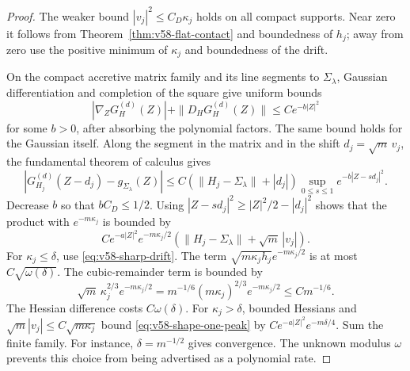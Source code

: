 \begin{proof}
The weaker bound $|v_j|^2\le C_D\kappa_j$ holds on all compact
supports. Near zero it follows from Theorem~\ref{thm:v58-flat-contact}
and boundedness of $h_j$; away from zero use the positive minimum of
$\kappa_j$ and boundedness of the drift.

On the compact accretive matrix family and its line segments to
$\Sigma_\lambda$, Gaussian differentiation and completion of the
square give uniform bounds
\[
 |\nabla_ZG_H^{(d)}(Z)|+\|D_HG_H^{(d)}(Z)\|
                                  \le C e^{-b|Z|^2}
\]
for some $b>0$, after absorbing the polynomial factors. The same
bound holds for the Gaussian itself. Along the segment in the
matrix and in the shift $d_j=\sqrt m\,v_j$, the fundamental theorem
of calculus gives
\[
 |G_{H_j}^{(d)}(Z-d_j)-g_{\Sigma_\lambda}(Z)|
 \le C(\|H_j-\Sigma_\lambda\|+|d_j|)
             \sup_{0\le s\le1}e^{-b|Z-sd_j|^2}.
\]
Decrease $b$ so that $bC_D\le1/2$. Using
$|Z-sd_j|^2\ge|Z|^2/2-|d_j|^2$ shows that the product with
$e^{-m\kappa_j}$ is bounded by
\begin{equation}\label{eq:v58-shape-one-peak}
 C e^{-a|Z|^2}e^{-m\kappa_j/2}
                   (\|H_j-\Sigma_\lambda\|+\sqrt m\,|v_j|).
\end{equation}
For $\kappa_j\le\delta$, use
\eqref{eq:v58-sharp-drift}. The term
$\sqrt{m\kappa_jh_j}e^{-m\kappa_j/2}$ is at most
$C\sqrt{\omega(\delta)}$. The cubic-remainder term is bounded by
\[
 \sqrt m\,\kappa_j^{2/3}e^{-m\kappa_j/2}
       =m^{-1/6}(m\kappa_j)^{2/3}e^{-m\kappa_j/2}
       \le C m^{-1/6}.
\]
The Hessian difference costs $C\omega(\delta)$. For
$\kappa_j>\delta$, bounded Hessians and
$\sqrt m|v_j|\le C\sqrt{m\kappa_j}$ bound
\eqref{eq:v58-shape-one-peak} by
$Ce^{-a|Z|^2}e^{-m\delta/4}$. Sum the finite family. For instance,
$\delta=m^{-1/2}$ gives convergence. The unknown modulus $\omega$
prevents this choice from being advertised as a polynomial rate.
\end{proof}


